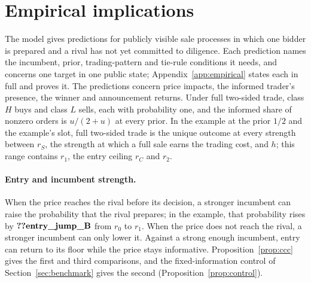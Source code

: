 \section{Empirical implications}\label{sec:empirical}

The model gives predictions for publicly visible sale processes in which one bidder is prepared and a rival has
not yet committed to diligence. Each prediction names the incumbent, prior, trading-pattern and tie-rule conditions
it needs, and concerns one target in one public state; Appendix~\ref{app:empirical} states each in full and proves
it. The predictions concern price impacts, the informed trader's presence, the winner and announcement returns.
Under full two-sided trade, class \(H\) buys and class \(L\) sells, each with probability one, and the informed share
of nonzero orders is \(u/(2+u)\) at every prior. In the example at the prior \(1/2\) and the example's slot, full
two-sided trade is the unique outcome at every strength between \(r_S\), the strength at which a full sale earns the
trading cost, and \(h\); this range contains \(r_1\), the entry ceiling \(r_C\) and \(r_2\).

\paragraph{Entry and incumbent strength.} When the price reaches the rival before its decision, a stronger
incumbent can raise the probability that the rival prepares; in the example, that probability rises by
\(\reg{entry_jump_B}\) from \(r_0\) to \(r_1\). When the price does not reach the rival, a stronger
incumbent can only lower it. Against a strong enough incumbent, entry can return to its floor while the price stays
informative. Proposition~\ref{prop:ccc} gives the first and third comparisons, and the fixed-information control of
Section~\ref{sec:benchmark} gives the second (Proposition~\ref{prop:control}).

